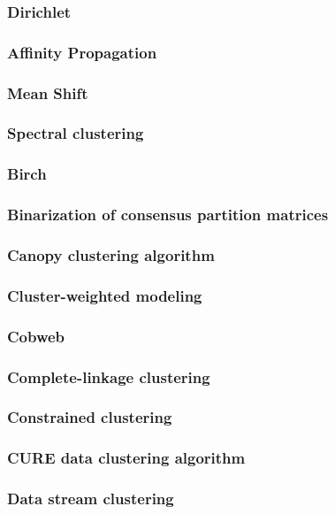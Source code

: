 \documentclass{VUMIFInfKursinis}
\begin{document}
\subsubsection{Dirichlet}

\subsubsection{Affinity Propagation}
\subsubsection{Mean Shift}
\subsubsection{Spectral clustering}
\subsubsection{Birch}


\subsubsection{Binarization of consensus partition matrices}
\subsubsection{Canopy clustering algorithm}
\subsubsection{Cluster-weighted modeling}
\subsubsection{Cobweb}
\subsubsection{Complete-linkage clustering}
\subsubsection{Constrained clustering}
\subsubsection{CURE data clustering algorithm}
\subsubsection{Data stream clustering}
\end{document}
